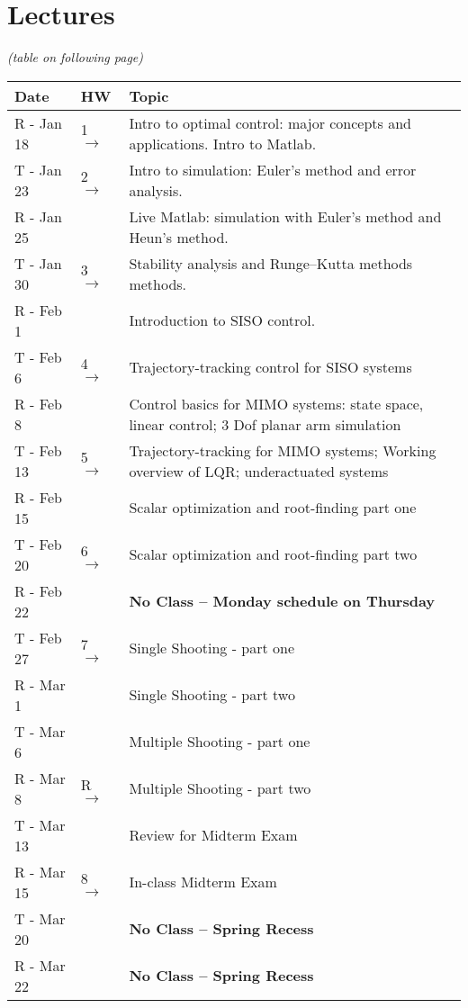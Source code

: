 \documentclass[onecolumn]{article}
\newcommand{\ra}{$\rightarrow$}
\begin{document}
\section*{Lectures}
\textit{(table on following page)}
\begin{table}
  \renewcommand{\arraystretch}{1.2}%
  \begin{tabular}{l|l|l}
    \textbf{Date} & \textbf{HW} & \textbf{Topic} \\
    \hline
    R - Jan 18 & 1 \ra & Intro to optimal control: major concepts and applications. Intro to Matlab. \\
    \hline
    T - Jan 23 & 2 \ra & Intro to simulation: Euler's method and error analysis. \\
    R - Jan 25 &       & Live Matlab: simulation with Euler's method and Heun's method.\\
    T - Jan 30 & 3 \ra & Stability analysis and Runge--Kutta methods methods.\\
    \hline
    R - Feb 1  &       & Introduction to SISO control. \\
    T - Feb 6  & 4 \ra & Trajectory-tracking control for SISO systems \\
    R - Feb 8  &       & Control basics for MIMO systems: state space, linear control; 3 Dof planar arm simulation  \\
    T - Feb 13 & 5 \ra & Trajectory-tracking for MIMO systems; Working overview of LQR; underactuated systems \\
    \hline
    R - Feb 15 &       &  Scalar optimization and root-finding part one\\
    T - Feb 20 & 6 \ra &  Scalar optimization and root-finding part two\\
    R - Feb 22 &       & \textbf{No Class -- Monday schedule on Thursday} \\
    \hline
    T - Feb 27 & 7 \ra & Single Shooting - part one \\
    R - Mar 1  &       & Single Shooting - part two  \\
    T - Mar 6  &       & Multiple Shooting - part one \\
    R - Mar 8  & R \ra & Multiple Shooting - part two \\
    \hline
    T - Mar 13 &       & Review for Midterm Exam \\
    R - Mar 15 & 8 \ra & In-class Midterm Exam \\
    T - Mar 20 &       & \textbf{No Class -- Spring Recess} \\
    R - Mar 22 &       & \textbf{No Class -- Spring Recess} \\

\end{tabular}
\end{table}
\end{document}

